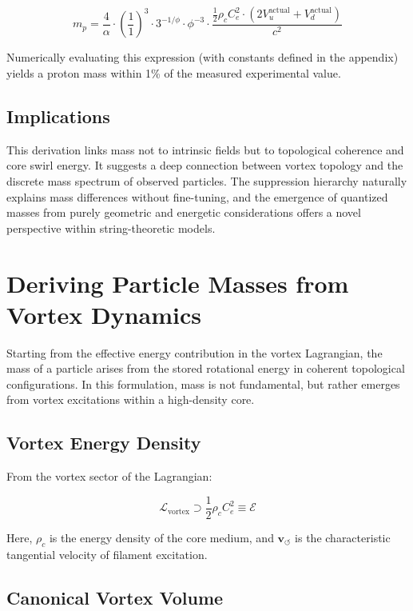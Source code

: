 \documentclass[11pt]{article}
\begin{document}
    \[
        m_p = \frac{4}{\alpha} \cdot \left( \frac{1}{1} \right)^3 \cdot 3^{-1/\phi} \cdot \phi^{-3} \cdot \frac{\frac{1}{2} \rho_c C_e^2 \cdot (2 V_u^{\text{actual}} + V_d^{\text{actual}})}{c^2}
    \]

    Numerically evaluating this expression (with constants defined in the appendix) yields a proton mass within 1\% of the measured experimental value.

    \subsection{Implications}

    This derivation links mass not to intrinsic fields but to topological coherence and core swirl energy. It suggests a deep connection between vortex topology and the discrete mass spectrum of observed particles. The suppression hierarchy naturally explains mass differences without fine-tuning, and the emergence of quantized masses from purely geometric and energetic considerations offers a novel perspective within string-theoretic models.


    \section{Deriving Particle Masses from Vortex Dynamics}

    Starting from the effective energy contribution in the vortex Lagrangian, the mass of a particle arises from the stored rotational energy in coherent topological configurations. In this formulation, mass is not fundamental, but rather emerges from vortex excitations within a high-density core.

    \subsection{Vortex Energy Density}

    From the vortex sector of the Lagrangian:

    \[
        \mathcal{L}_\text{vortex} \supset \frac{1}{2} \rho_c C_e^2 \equiv \mathcal{E}
    \]

    Here, \( \rho_c \) is the energy density of the core medium, and \( \mathbf{v}_{\scriptscriptstyle\boldsymbol{\circlearrowleft}} \) is the characteristic tangential velocity of filament excitation.

    \subsection{Canonical Vortex Volume}
\end{document}
